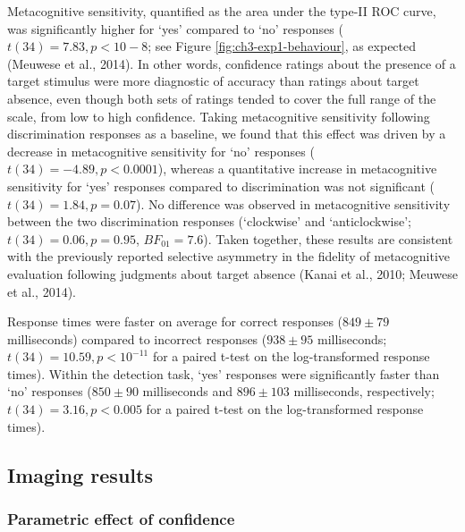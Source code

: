 \documentclass[12pt,twoside]{reedthesis}
\begin{document}
Metacognitive sensitivity, quantified as the area under the type-II ROC curve, was significantly higher for `yes' compared to `no' responses (\(t(34) = 7.83, p<10-8\); see Figure \ref{fig:ch3-exp1-behaviour}, as expected (Meuwese et al., 2014). In other words, confidence ratings about the presence of a target stimulus were more diagnostic of accuracy than ratings about target absence, even though both sets of ratings tended to cover the full range of the scale, from low to high confidence. Taking metacognitive sensitivity following discrimination responses as a baseline, we found that this effect was driven by a decrease in metacognitive sensitivity for `no' responses (\(t(34) = -4.89, p<0.0001\)), whereas a quantitative increase in metacognitive sensitivity for `yes' responses compared to discrimination was not significant (\(t(34)=1.84, p=0.07\)). No difference was observed in metacognitive sensitivity between the two discrimination responses (`clockwise' and `anticlockwise'; \(t(34) = 0.06, p=0.95\), \(BF_{01}=7.6\)). Taken together, these results are consistent with the previously reported selective asymmetry in the fidelity of metacognitive evaluation following judgments about target absence (Kanai et al., 2010; Meuwese et al., 2014).

Response times were faster on average for correct responses (\(849 ± 79\) milliseconds) compared to incorrect responses (\(938 ± 95\) milliseconds; \(t(34)=10.59, p<10^{-11}\) for a paired t-test on the log-transformed response times). Within the detection task, `yes' responses were significantly faster than `no' responses (\(850 ± 90\) milliseconds and \(896 ± 103\) milliseconds, respectively; \(t(34)=3.16, p<0.005\) for a paired t-test on the log-transformed response times).

\hypertarget{imaging-results}{%
\subsection{Imaging results}\label{imaging-results}}

\hypertarget{parametric-effect-of-confidence}{%
\subsubsection*{Parametric effect of confidence}\label{parametric-effect-of-confidence}}
\end{document}
